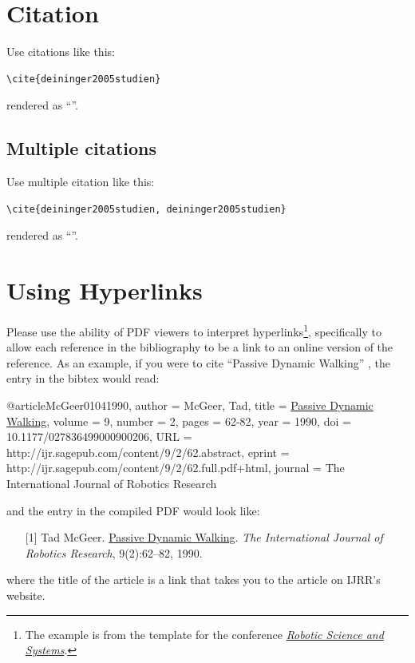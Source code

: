 \section{Citation}

Use citations like this:
{\small
\begin{verbatim}
\cite{deininger2005studien}
\end{verbatim}
}
rendered as ``\cite{deininger2005studien}''.

\subsection{Multiple citations}
Use multiple citation like this:
{\small
\begin{verbatim}
\cite{deininger2005studien, deininger2005studien}
\end{verbatim}
}
rendered as ``\cite{deininger2005studien, deininger2005studien}''.

\section{Using Hyperlinks}
Please use the ability of PDF viewers to interpret hyperlinks\footnote{The example is from the template for the conference \href{http://www.roboticsconference.org/information/authorinfo/}{\textit{Robotic Science and Systems}}.}, specifically to allow each reference in the bibliography to be a
link to an online version of the reference.
As an example, if you were to cite ``Passive Dynamic Walking''
\cite{McGeer01041990}, the entry in the bibtex would read:

{\tiny
\begin{spverbatim}
@article{McGeer01041990,
  author = {McGeer, Tad},
  title = {\href{http://ijr.sagepub.com/content/9/2/62.abstract}{Passive Dynamic Walking}},
  volume = {9},
  number = {2},
  pages = {62-82},
  year = {1990},
  doi = {10.1177/027836499000900206},
  URL = {http://ijr.sagepub.com/content/9/2/62.abstract},
  eprint = {http://ijr.sagepub.com/content/9/2/62.full.pdf+html},
  journal = {The International Journal of Robotics Research}
}
\end{spverbatim}
}
\noindent
and the entry in the compiled PDF would look like:

\def\tmplabel#1{[#1]}

\begin{enumerate}
\item[\tmplabel{1}] Tad McGeer. \href{http://ijr.sagepub.com/content/9/2/62.abstract}{Passive Dynamic
Walking}. {\em The International Journal of Robotics Research}, 9(2):62--82,
1990.
\end{enumerate}
%
where the title of the article is a link that takes you to the article on IJRR's website.


